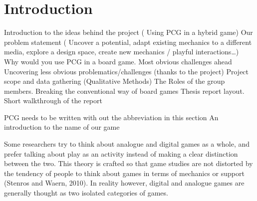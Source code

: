 \section{Introduction}
Introduction to the ideas behind the project  ( Using PCG in a hybrid game)
Our problem statement ( Uncover a potential, adapt existing mechanics to a different media, explore a design space, create new mechanics / playful interactions…)
Why would you use PCG in a board game.
Most obvious challenges ahead
Uncovering less obvious problematics/challenges (thanks to the project)
Project scope and data gathering (Qualitative Methods)
The Roles of the group members.
Breaking the conventional way of board games
Thesis report layout. Short walkthrough of the report


PCG needs to be written with out the abbreviation in this section
An introduction to the name of our game



Some researchers try to think about analogue and digital games as a whole, and prefer talking about play as an activity instead of making a clear distinction between the two. This theory is crafted so that game studies are not distorted by the tendency of people to think about games in terms of mechanics or support (Stenros and Waern, 2010). In reality however, digital and analogue games are generally thought as two isolated categories of games.